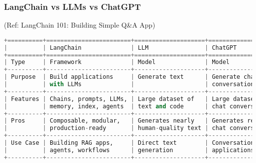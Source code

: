 \begin{frame}[fragile]\frametitle{LangChain vs LLMs vs ChatGPT}

{\tiny (Ref: LangChain 101: Building Simple Q\&A App)}


\begin{lstlisting}[language=python, basicstyle=\tiny]
+==========+========================+====================+====================+
|          | LangChain              | LLM                | ChatGPT            | 
+==========+========================+====================+====================+
| Type     | Framework              | Model              | Model              | 
+----------+------------------------+--------------------+--------------------+
| Purpose  | Build applications     | Generate text      | Generate chat      | 
|          | with LLMs              |                    | conversations      | 
+----------+------------------------+--------------------+--------------------+
| Features | Chains, prompts, LLMs, | Large dataset of   | Large dataset of   | 
|          | memory, index, agents  | text and code      | chat conversations | 
+----------+------------------------+--------------------+--------------------+
| Pros     | Composable, modular,   | Generates nearly   | Generates realistic| 
|          | production-ready       | human-quality text | chat conversations | 
+----------+------------------------+--------------------+--------------------+
| Use Case | Building RAG apps,     | Direct text        | Conversational AI  | 
|          | agents, workflows      | generation         | applications       | 
+----------+------------------------+--------------------+--------------------+
\end{lstlisting}

\end{frame}

